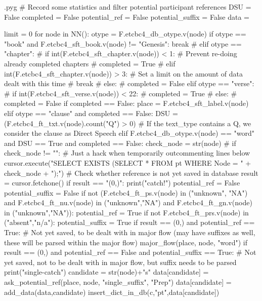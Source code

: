\documentclass{report}
\makeatletter
\newenvironment{python}{%
  \VerbatimEnvironment
  \minted@resetoptions
  \setkeys{minted@opt}{}
      \begin{VerbatimOut}{\jobname.pyg}}
{%
      \end{VerbatimOut}
      \minted@pygmentize{python}
      \DeleteFile{\jobname.pyg}}
\makeatother
\begin{document}
\begin{python}
# Record some statistics and filter potential participant references
DSU = False
completed = False
potential_ref = False
potential_suffix = False
data = {}

limit = 0
for node in NN():
    otype = F.etcbc4_db_otype.v(node)
    if otype == "book" and F.etcbc4_sft_book.v(node) != "Genesis":
        break
#    elif otype == "chapter":
#        if int(F.etcbc4_sft_chapter.v(node)) < 1:    # Prevent re-doing already completed chapters
#            completed = True
#        elif int(F.etcbc4_sft_chapter.v(node)) > 3:    # Set a limit on the amount of data dealt with this time
#            break
#        else:
#            completed = False 
    elif otype == "verse":
#        if int(F.etcbc4_sft_verse.v(node)) < 22:
#           completed = True
#        else:
#           completed = False
        if completed == False:
            place = F.etcbc4_sft_label.v(node)
    elif otype == "clause" and completed == False:
        DSU = (F.etcbc4_ft_txt.v(node).count("Q") > 0)    # If the text_type contains a Q, we consider the clause as Direct Speech
    elif F.etcbc4_db_otype.v(node) == "word" and DSU == True and completed == False:
        check_node = str(node)
#        if check_node != "":     # Just a hack when temporarily outcommenting lines below
        cursor.execute("SELECT EXISTS (SELECT * FROM pt WHERE Node = " + check_node + ");") # Check whether reference is not yet saved in database
        result = cursor.fetchone()
        if result == "(0,)":
            print("catch!")
        potential_ref = False
        potential_suffix = False
        if not (F.etcbc4_ft_ps.v(node) in ("unknown", "NA") and F.etcbc4_ft_nu.v(node) in ("unknown","NA") and F.etcbc4_ft_gn.v(node) in ("unknown","NA")):
            potential_ref = True
        if not F.etcbc4_ft_prs.v(node) in ("absent","n/a"):
            potential_suffix = True
        if result == (0,) and potential_ref == True: # Not yet saved, to be dealt with in major flow (may have suffixes as well, these will be parsed within the major flow)
            major_flow(place, node, "word")
        if result == (0,) and potential_ref == False and potential_suffix == True: # Not yet saved, not to be dealt with in major flow, but suffix needs to be parsed
            print("single-catch")
            candidate = str(node)+"s"
            data[candidate] = ask_potential_ref(place, node, "single_suffix", "Prep")
            data[candidate] = add_data(data,candidate)
            insert_dict_in_db(c,"pt",data[candidate])

\end{python}
\end{document}
